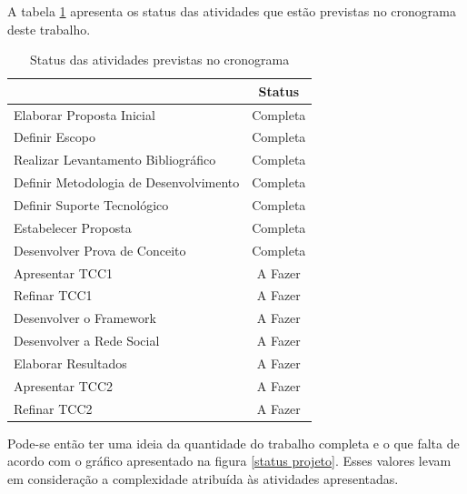 A tabela \ref{status atividades} apresenta os status das atividades que estão previstas no cronograma deste trabalho.

\newpage

\begin{table}[h]
\centering
\caption{Status das atividades previstas no cronograma}
\label{status atividades}
\begin{tabular}{|l|c|}
\hline
                                       & Status   \\ \hline
Elaborar Proposta Inicial              & Completa \\ \hline
Definir Escopo                         & Completa \\ \hline
Realizar Levantamento Bibliográfico    & Completa \\ \hline
Definir Metodologia de Desenvolvimento & Completa \\ \hline
Definir Suporte Tecnológico            & Completa \\ \hline
Estabelecer Proposta                   & Completa \\ \hline
Desenvolver Prova de Conceito          & Completa \\ \hline
Apresentar TCC1                        & A Fazer  \\ \hline
Refinar TCC1                           & A Fazer  \\ \hline
Desenvolver o Framework                & A Fazer  \\ \hline
Desenvolver a Rede Social              & A Fazer  \\ \hline
Elaborar Resultados                    & A Fazer  \\ \hline
Apresentar TCC2                        & A Fazer  \\ \hline
Refinar TCC2                           & A Fazer  \\ \hline
\end{tabular}
\end{table}

Pode-se então ter uma ideia da quantidade do trabalho completa e o que falta de acordo com o gráfico apresentado na figura \ref{status projeto}. Esses valores levam em consideração a complexidade atribuída às atividades apresentadas.

